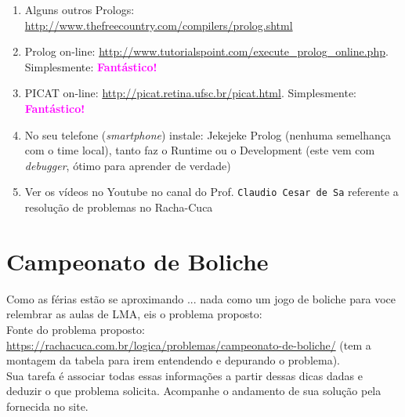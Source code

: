 \documentclass[a4paper,12pt]{article}
\begin{document}
\begin{enumerate}


\item Alguns outros Prologs:  \url{http://www.thefreecountry.com/compilers/prolog.shtml}

\item Prolog on-line: \url{http://www.tutorialspoint.com/execute_prolog_online.php}. Simplesmente: \textbf{\textcolor{magenta}{Fantástico!}}

\item PICAT on-line: \url{http://picat.retina.ufsc.br/picat.html}. Simplesmente: \textbf{\textcolor{magenta}{Fantástico!}}



 \item No seu telefone (\emph{smartphone}) instale: Jekejeke Prolog (nenhuma semelhança com o time local), tanto faz o Runtime ou o Development (este vem com 
 \emph{debugger}, ótimo para aprender de verdade)
 
 \item Ver os vídeos no Youtube no canal do Prof. \texttt{Claudio Cesar de Sa} referente
 a resolução de problemas no Racha-Cuca

\end{enumerate}





\newpage
\tableofcontents


\newpage
\section{Campeonato de Boliche}

Como as férias estão se aproximando ... nada como um jogo de boliche para voce 
relembrar as aulas de LMA, eis o problema proposto:\\
 Fonte do problema proposto:\\
 \url{https://rachacuca.com.br/logica/problemas/campeonato-de-boliche/}
 (tem a montagem da tabela para irem entendendo e depurando o problema).\\


\vspace{1.5cm}
 Sua tarefa é associar todas essas informações a partir dessas dicas dadas e deduzir o que problema solicita. Acompanhe o andamento de sua solução pela fornecida no site.
\newpage
\end{document}
